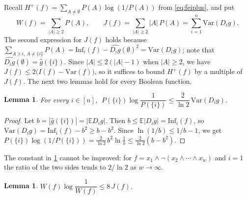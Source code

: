 \documentclass[11pt]{amsart}
\newtheorem{lemma}[theorem]{Lemma}
\theoremstyle{definition}
\theoremstyle{remark}
\newcommand{\E}{\mathbb{E}}
\newcommand{\Inf}{\mathrm{Inf}}
\newcommand{\Var}{\mathrm{Var}}
\newcommand{\hatg}{\widehat{g}}
\begin{document}
Recall $H^+(f)=\sum_{A\ne\emptyset}P(A)\log(1/P(A))$ from \eqref{eq:feiplus}, and put
\[
W(f)=\sum_{|A|\ge2}P(A),\qquad J(f)=\sum_{|A|\ge2}|A|\,P(A)=\sum_{i=1}^n\Var(D_ig).
\]
The second expression for $J(f)$ holds because $\sum_{A\ni i,\,A\ne\{i\}}P(A)=\Inf_i(f)-\widehat{D_ig}(\emptyset)^2
=\Var(D_ig)$; note that $\widehat{D_ig}(\emptyset)=\hatg(\{i\})$. Since $|A|\le2(|A|-1)$ when $|A|\ge2$, we have
$J(f)\le2\bigl(I(f)-\Var(f)\bigr)$, so it suffices to bound $H^+(f)$ by a multiple of $J(f)$. The next two lemmas
hold for every Boolean function.

\begin{lemma}\label{lem:single}
For every $i\in[n]$, $\;P(\{i\})\log\dfrac1{P(\{i\})}\le\dfrac2{\ln2}\,\Var(D_ig)$.
\end{lemma}

\begin{proof}
Let $b=|\hatg(\{i\})|=|\E D_ig|$. Then $b\le\E|D_ig|=\Inf_i(f)$, so $\Var(D_ig)=\Inf_i(f)-b^2\ge b-b^2$. Since
$\ln(1/b)\le1/b-1$, we get $P(\{i\})\log(1/P(\{i\}))=\frac2{\ln2}\,b^2\ln\frac1b\le\frac2{\ln2}(b-b^2)$.
\end{proof}

The constant in \cref{lem:single} cannot be improved: for $f=x_1\wedge\neg(x_2\wedge\cdots\wedge x_w)$ and $i=1$
the ratio of the two sides tends to $2/\ln 2$ as $w\to\infty$.

\begin{lemma}\label{lem:mass}
$W(f)\log\dfrac1{W(f)}\le8\,J(f)$.
\end{lemma}
\end{document}
